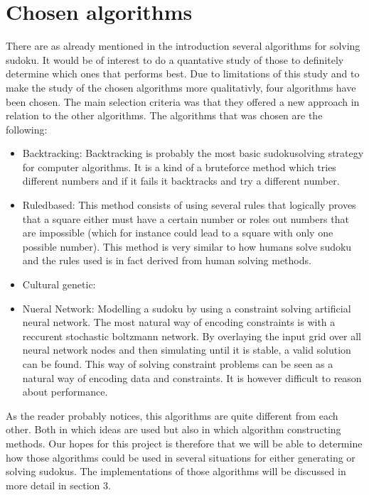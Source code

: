 \documentclass[a4paper,11pt]{kth-mag}
\begin{document}
\section{Chosen algorithms}
There are as already mentioned in the introduction several algorithms for solving sudoku. It would be of interest to do a quantative study of those to definitely determine which ones that performs best. Due to limitations of this study and to make the study of the chosen algorithms more qualitativly, four algorithms have been chosen. The main selection criteria was that they offered a new approach in relation to the other algorithms. The algorithms that was chosen are the following:
\begin{itemize}
    \item Backtracking: Backtracking is probably the most basic sudokusolving strategy for computer algorithms. It is a kind of a bruteforce method which tries different numbers and if it fails it backtracks and try a different number.
    \item Ruledbased: This method consists of using several rules that logically proves that a square either must have a certain number or roles out numbers that are impossible (which for instance could lead to a square with only one possible number). This method is very similar to how humans solve sudoku and the rules used is in fact derived from human solving methods.
    \item Cultural genetic: 
    \item Nueral Network: Modelling a sudoku by using a constraint solving artificial neural network. The most natural way of encoding constraints is with a reccurent stochastic boltzmann network. By overlaying the input grid over all neural network nodes and then simulating until it is stable, a valid solution can be found. This way of solving constraint problems can be seen as a natural way of encoding data and constraints. It is however difficult to reason about performance.
\end{itemize}

As the reader probably notices, this algorithms are quite different from each other. Both in which ideas are used but also in which algorithm constructing methods. Our hopes for this project is therefore that we will be able to determine how those algorithms could be used in several situations for either generating or solving sudokus. The implementations of those algorithms will be discussed in more detail in section 3. 
\end{document}
